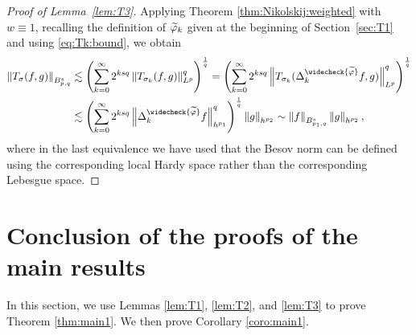 \begin{proof}[Proof of Lemma~\ref{lem:T3}]
Applying Theorem \ref{thm:Nikolskij:weighted} with $w\equiv 1$, recalling the definition of $\widetilde{\varphi}_k$ given at the beginning of Section~\ref{sec:T1} and using \eqref{eq:Tk:bound}, we obtain
\begin{align*}
\norm{T_\sigma(f,g)}{\ibes{p}{s}{q}}&\lesssim \left(\sum_{k=0}^\infty 2^{ksq}\norm{T_{\sigma_k}(f,g)}{L^p}^q\right)^{\frac{1}{q}}=\left(\sum_{k=0}^\infty 2^{ksq}\norm{T_{\sigma_k}(\Delta^{\widecheck{\widetilde{\f}}}_k f,g)}{L^p}^q\right)^{\frac{1}{q}}\\
&\lesssim\left(\sum_{k=0}^\infty 2^{ksq}\norm{\Delta^{\widecheck{\widetilde{\f}}}_k f}{h^{p_1}}^q\right)^{\frac{1}{q}}\norm{g}{h^{p_2}}\sim \norm{f}{\ibes{p_1}{s}{q}}\norm{g}{h^{p_2}},
\end{align*}
where in the last equivalence we have used that the Besov norm can be defined using the corresponding local Hardy space rather than the corresponding Lebesgue space.
\end{proof}
\section{Conclusion of the proofs of the main results}\label{sec:proof:main}
In this section, we use Lemmas \ref{lem:T1}, \ref{lem:T2}, and \ref{lem:T3} to prove Theorem \ref{thm:main1}. We then prove Corollary \ref{coro:main1}.

